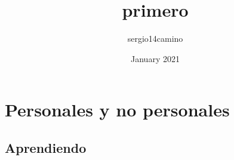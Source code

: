 \documentclass[12pt]{book}
\title{primero}
\author{sergio14camino }
\date{January 2021}
\begin{document}
\maketitle
\tableofcontents

\chapter{Personales y no personales}

\section{Aprendiendo}
\end{document}
